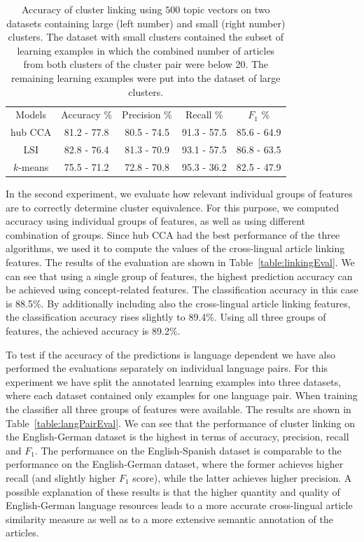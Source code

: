 \begin{table}[h]
\caption{Accuracy of cluster linking using $500$ topic vectors on two datasets containing large (left number) and small (right number) clusters. The dataset with small clusters contained the subset of learning examples in which the combined number of articles from both clusters of the cluster pair were below 20. The remaining learning examples were put into the dataset of large clusters.}
\label{table:linkingEvalAlgosLargeSmall}
\begin{center}
\begin{tabular}{|c|c|c|c|c|}
  \hline
  \cline{1-5}
  Models & Accuracy \% & Precision \% & Recall \% & $F_1$ \% \\ \cline{1-5}
  hub CCA  & 81.2 - 77.8 & 80.5 - 74.5 & 91.3 - 57.5 & 85.6 - 64.9 \\ \cline{1-5}
  LSI      & 82.8 - 76.4 & 81.3 - 70.9 & 93.1 - 57.5 & 86.8 - 63.5 \\ \cline{1-5}
 $k$-means & 75.5 - 71.2 & 72.8 - 70.8 & 95.3 - 36.2 & 82.5 - 47.9 \\ \cline{1-5}
\end{tabular}
\end{center}
\end{table}

In the second experiment, we evaluate how relevant individual groups of features are to correctly determine cluster equivalence. For this purpose, we computed accuracy using individual groups of features, as well as using different combination of groups. Since hub CCA had the best  performance of the three algorithms, we used it to compute the values of the cross-lingual article linking features. The results of the evaluation are shown in Table~\ref{table:linkingEval}. We can see that using a single group of features, the highest prediction accuracy can be achieved using  concept-related features. The classification accuracy in this case is 88.5\%. By additionally including also the cross-lingual article linking features, the classification accuracy rises slightly to 89.4\%. Using all three groups of features, the achieved accuracy is 89.2\%.

To test if the accuracy of the predictions is language dependent we have also performed the evaluations separately on individual language pairs. For this experiment we have split the annotated learning examples into three datasets, where each dataset contained only examples for one language pair. When training the classifier all three groups of features were available. The results are shown in Table~\ref{table:langPairEval}. We can see that the performance of cluster linking on the English-German dataset is the highest in terms of accuracy, precision, recall and $F_1$. The performance on the English-Spanish dataset is comparable to the performance on the English-German dataset, where the former achieves higher recall (and slightly higher $F_1$ score), while the latter achieves higher precision. A possible explanation of these results is that the higher quantity and quality of English-German language resources leads to a more accurate cross-lingual article similarity measure as well as to a more extensive semantic annotation of the articles.

